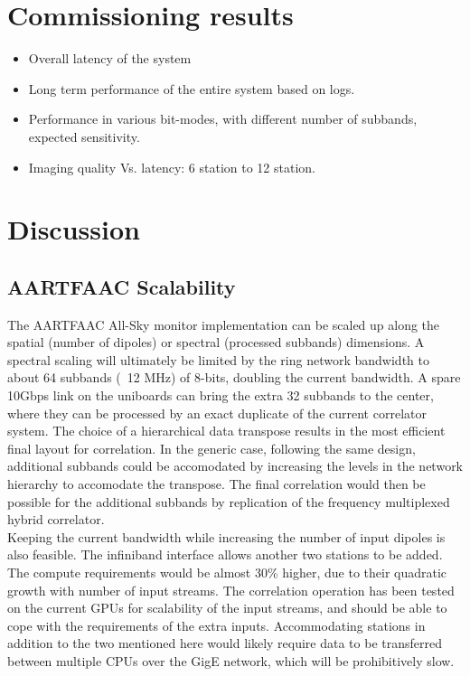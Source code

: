 \documentclass{ws-jai}
\begin{document}
\section {\label{sec:results} Commissioning results}
\begin {itemize}
 \item {Overall latency of the system}
 \item {Long term performance of the entire system based on logs.}
 \item {Performance  in various  bit-modes, with  different number  of subbands,
   expected sensitivity.}
 \item {Imaging quality Vs. latency: 6 station to 12 station.}
\end {itemize}

\section {\label{sec:discussion} Discussion}
\subsection {AARTFAAC Scalability}
The AARTFAAC All-Sky  monitor implementation can be scaled up  along the spatial
(number  of dipoles)  or spectral  (processed subbands)  dimensions. A  spectral
scaling will  ultimately be limited  by the ring  network bandwidth to  about 64
subbands (~12  MHz) of 8-bits,  doubling the  current bandwidth. A  spare 10Gbps
link on the uniboards can bring the  extra 32 subbands to the center, where they
can be  processed by an  exact duplicate of  the current correlator  system. The
choice of  a hierarchical  data transpose  results in  the most  efficient final
layout  for  correlation.  In  the  generic case,  following  the  same  design,
additional subbands could be accomodated by increasing the levels in the network
hierarchy  to accomodate  the transpose.  The  final correlation  would then  be
possible for the additional subbands by replication of the frequency multiplexed
hybrid correlator.\\

Keeping the  current bandwidth while increasing  the number of input  dipoles is
also  feasible. The  infiniband  interface  allows another  two  stations to  be
added.  The compute  requirements  would be  almost 30\%  higher,  due to  their
quadratic growth  with number of  input streams.  The correlation  operation has
been tested on the current GPUs for scalability of the input streams, and should
be  able to  cope  with  the requirements  of  the  extra inputs.  Accommodating
stations in addition to  the two mentioned here would likely  require data to be
transferred  between  multiple  CPUs  over  the  GigE  network,  which  will  be
prohibitively slow.
\end{document}

